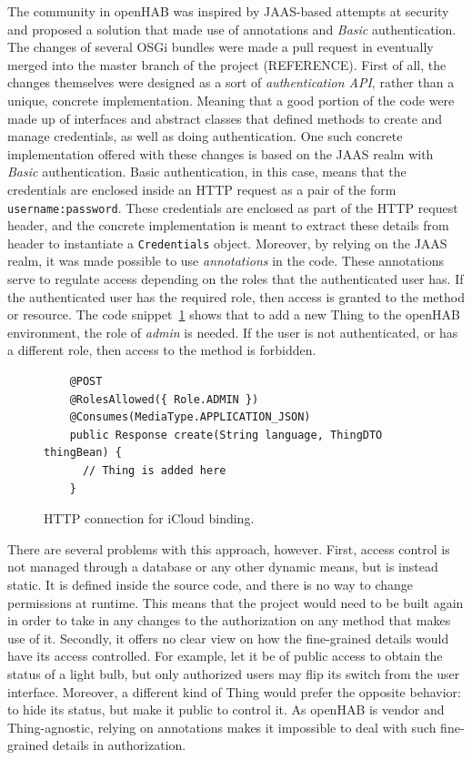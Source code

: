 \documentclass[12pt]{article}
\begin{document}
The community in openHAB was inspired by JAAS-based attempts at security and proposed a solution that made use of annotations and \emph{Basic} authentication. The changes of several OSGi bundles were made a pull request in eventually merged into the master branch of the project (REFERENCE). First of all, the changes themselves were designed as a sort of \emph{authentication API}, rather than a unique, concrete implementation. Meaning that a good portion of the code were made up of interfaces and abstract classes that defined methods to create and manage credentials, as well as doing authentication. One such concrete implementation offered with these changes is based on the JAAS realm with \emph{Basic} authentication. Basic authentication, in this case, means that the credentials are enclosed inside an HTTP request as a pair of the form \texttt{username:password}. These credentials are enclosed as part of the HTTP request header, and the concrete implementation is meant to extract these details from header to instantiate a \texttt{Credentials} object. Moreover, by relying on the JAAS realm, it was made possible to use \emph{annotations} in the code. These annotations serve to regulate access depending on the roles that the authenticated user has. If the authenticated user has the required role, then access is granted to the method or resource. The code snippet~\ref{lst:jaas_roles} shows that to add a new Thing to the openHAB environment, the role of \emph{admin} is needed. If the user is not authenticated, or has a different role, then access to the method is forbidden. 

\begin{figure} [htb]
\begin{lstlisting}
    @POST
    @RolesAllowed({ Role.ADMIN })
    @Consumes(MediaType.APPLICATION_JSON)
    public Response create(String language, ThingDTO thingBean) {
      // Thing is added here
    }
\end{lstlisting}
\caption{HTTP connection for iCloud binding.}
\label{lst:jaas_roles}
\end{figure}

There are several problems with this approach, however. First, access control is not managed through a database or any other dynamic means, but is instead static. It is defined inside the source code, and there is no way to change permissions at runtime. This means that the project would need to be built again in order to take in any changes to the authorization on any method that makes use of it. Secondly, it offers no clear view on how the fine-grained details would have its access controlled. For example, let it be of public access to obtain the status of a light bulb, but only authorized users may flip its switch from the user interface. Moreover, a different kind of Thing would prefer the opposite behavior: to hide its status, but make it public to control it. As openHAB is vendor and Thing-agnostic, relying on annotations makes it impossible to deal with such fine-grained details in authorization.
\end{document}

